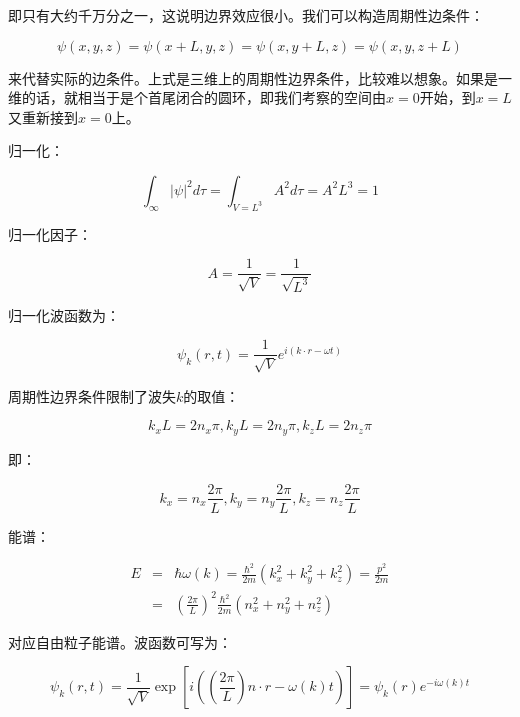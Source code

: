 即只有大约千万分之一，这说明边界效应很小。我们可以构造周期性边条件：

\begin{equation}
\psi (x,y,z) = \psi (x + L,y,z) = \psi (x,y + L,z) = \psi (x,y,z + L)
\end{equation}

来代替实际的边条件。上式是三维上的周期性边界条件，比较难以想象。如果是一维的话，就相当于是个首尾闭合的圆环，即我们考察的空间由$x=0$开始，到$x=L$又重新接到$x=0$上。

归一化：

\begin{equation}
\int_\infty  {\left| \psi  \right|^2 d\tau }  = \int_{V = L^3 } {A^2 d\tau }  = A^2 L^3  = 1
\end{equation}

归一化因子：

\begin{equation}
A = \frac{1}{{\sqrt V }} = \frac{1}{{\sqrt {L^3 } }}
\end{equation}

归一化波函数为：

\begin{equation}
\psi _k (r,t) = \frac{1}{{\sqrt V }}e^{i(k \cdot r - \omega t)} 
\end{equation}

周期性边界条件限制了波失$k$的取值：

\begin{equation}
k_x L = 2 n_x \pi , k_y L = 2 n_y \pi ,k_z L = 2n_z \pi 
\end{equation}

即：

\begin{equation}
k_x  = n_x \frac{{2\pi }}{L},k_y  = n_y \frac{{2\pi }}{L},k_z  = n_z \frac{{2\pi }}{L}
\end{equation}

能谱：

\begin{eqnarray*}
E &=& \hbar \omega (k) = \frac{{\hbar ^2 }}{{2m}}\left( {k_x ^2  + k_y ^2  + k_z ^2 } \right) = \frac{{p^2 }}{{2m}}  \\
{} &=& \left( {\frac{{2\pi }}{L}} \right)^2 \frac{{\hbar ^2 }}{{2m}}\left( {n_x ^2  + n_y ^2  + n_z ^2 } \right)
\end{eqnarray*}

对应自由粒子能谱。波函数可写为：

\begin{equation}
\psi _k (r,t) = \frac{1}{{\sqrt V }}\exp \left[ {i\left( {\left( {\frac{{2\pi }}{L}} \right)n \cdot r - \omega (k)t} \right)} \right] = \psi _k (r)e^{ - i\omega (k)t}
\end{equation}

